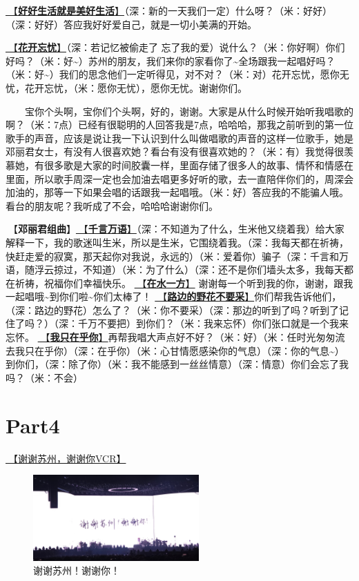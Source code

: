 \documentclass[]{ctexbook}
\begin{document}
\hyperref[live-happy-life-happy]{🎵【\textbf{好好生活就是美好生活}】}（深：新的一天我们一定）什么呀？（米：好好）（深：好好）答应我好好爱自己，就是一切小美满的开始。

\hyperref[no-worries]{🎵【\textbf{花开忘忧}】}（深：若记忆被偷走了 忘了我的爱）说什么？（米：你好啊）你们好吗？（米：好\textasciitilde）苏州的朋友，我们来你的家看你了\textasciitilde 全场跟我一起唱好吗？（米：好\textasciitilde）我们的思念他们一定听得见，对不对？（米：对）花开忘忧，愿你无忧，花开忘忧，（米：愿你无忧），愿你无忧。谢谢你们。

  宝你个头啊，宝你们个头啊，好的，谢谢。大家是从什么时候开始听我唱歌的啊？（米：7点）已经有很聪明的人回答我是7点，哈哈哈，那我之前听到的第一位歌手的声音，应该是说让我一下认识到什么叫做唱歌的声音的这样一位歌手，她是邓丽君女士，有没有人很喜欢她？看台有没有很喜欢她的？（米：有）我觉得很羡慕她，有很多歌是大家的时间胶囊一样，里面存储了很多人的故事、情怀和情感在里面，所以歌手周深一定也会加油去唱更多好听的歌，去一直陪伴你们的，周深会加油的，那等一下如果会唱的话跟我一起唱哦。（米：好）答应我的不能骗人哦。看台的朋友呢？我听成了不会，哈哈哈谢谢你们。

🎵【\textbf{邓丽君组曲}】\hyperref[thousands-of-words]{🎵【\textbf{千言万语}】}（深：不知道为了什么，生米他又绕着我）给大家解释一下，我的歌迷叫生米，所以是生米，它围绕着我。（深：我每天都在祈祷，快赶走爱的寂寞，那天起你对我说，永远的）（米：爱着你）骗子（深：千言和万语，随浮云掠过，不知道）（米：为了什么）（深：还不是你们墙头太多，我每天都在祈祷，祝福你们幸福快乐。
\hyperref[on-the-water-side]{🎵【\textbf{在水一方}】} 谢谢每一个听到我的你，谢谢，跟我一起唱哦\textasciitilde 到你们啦\textasciitilde 你们太棒了！
\hyperref[only-with-me]{🎵【\textbf{路边的野花不要采}】}你们帮我告诉他们，（深：路边的野花）怎么了？（米：你不要采）（深：那边的听到了吗？听到了记住了吗？）（深：千万不要把）到你们？（米：我来忘怀）你们张口就是一个我来忘怀。
\hyperref[only-you]{🎵【\textbf{我只在乎你}】}再帮我唱大声点好不好？（米：好）（米：任时光匆匆流去我只在乎你）（深：在乎你）（米：心甘情愿感染你的气息）（深：你的气息\textasciitilde）到你们，（深：除了你）（米：我不能感到一丝丝情意）（深：情意）你们会忘了我吗？（米：不会）

\section{Part4}\label{suzhou-20241110-part4}

\hyperref[thank-you-vcr]{🎥【谢谢苏州，谢谢你VCR】}

\begin{figure}

{\centering \includegraphics[width=180pt]{img/suzhou20241110/thank-suzhou} 

}

\caption{谢谢苏州！谢谢你！}\label{fig:unnamed-chunk-113}
\end{figure}
\end{document}
